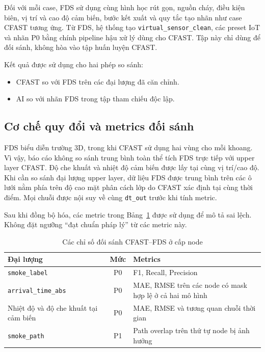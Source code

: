 Đối với mỗi case, FDS sử dụng cùng hình học rút gọn, nguồn cháy, điều kiện biên, vị trí và cao độ cảm biến, bước kết xuất và quy tắc tạo nhãn như case CFAST tương ứng. Từ FDS, hệ thống tạo \texttt{virtual\_sensor\_clean}, các preset IoT và nhãn P0 bằng chính pipeline hậu xử lý dùng cho CFAST. Tập này chỉ dùng để đối sánh, không hòa vào tập huấn luyện CFAST.

Kết quả được sử dụng cho hai phép so sánh:
\begin{itemize}
  \item CFAST so với FDS trên các đại lượng đã căn chỉnh.
  \item AI so với nhãn FDS trong tập tham chiếu độc lập.
\end{itemize}

\subsection{Cơ chế quy đổi và metrics đối sánh}

FDS biểu diễn trường 3D, trong khi CFAST sử dụng hai vùng cho mỗi khoang. Vì vậy, báo cáo không so sánh trung bình toàn thể tích FDS trực tiếp với upper layer CFAST. Độ che khuất và nhiệt độ cảm biến được lấy tại cùng vị trí/cao độ. Khi cần so sánh đại lượng upper layer, dữ liệu FDS được trung bình trên các ô lưới nằm phía trên độ cao mặt phân cách lớp do CFAST xác định tại cùng thời điểm. Mọi chuỗi được nội suy về cùng \texttt{dt\_out} trước khi tính metric.

Sau khi đồng bộ hóa, các metric trong Bảng~\ref{tab:cfast_fds_metrics} được sử dụng để mô tả sai lệch. Không đặt ngưỡng ``đạt chuẩn pháp lý'' từ các metric này.

\begin{table}[H]
\centering
\caption{Các chỉ số đối sánh CFAST--FDS ở cấp node}
\label{tab:cfast_fds_metrics}
\begin{tabularx}{\textwidth}{l c X}
\toprule
\textbf{Đại lượng} & \textbf{Mức} & \textbf{Metrics} \\
\midrule
\texttt{smoke\_label} & P0 & F1, Recall, Precision \\
\texttt{arrival\_time\_abs} & P0 & MAE, RMSE trên các node có mask hợp lệ ở cả hai mô hình \\
Nhiệt độ và độ che khuất tại cảm biến & P0 & MAE, RMSE và tương quan chuỗi thời gian \\
\texttt{smoke\_path} & P1 & Path overlap trên thứ tự node bị ảnh hưởng \\
\bottomrule
\end{tabularx}
\end{table}

